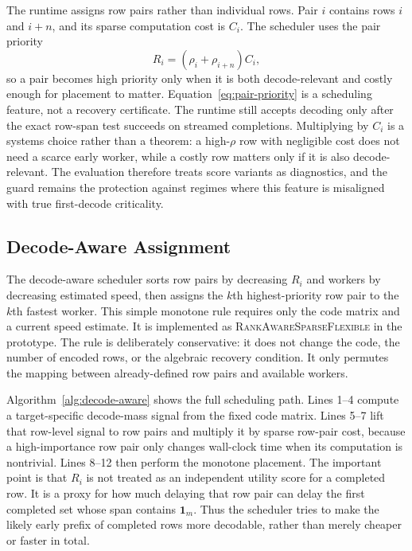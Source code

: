 The runtime assigns row pairs rather than individual rows.  Pair $i$ contains
rows $i$ and $i+n$, and its sparse computation cost is $C_i$.  The scheduler
uses the pair priority
\begin{equation}
  \label{eq:pair-priority}
  R_i = (\rho_i + \rho_{i+n}) C_i,
\end{equation}
so a pair becomes high priority only when it is both decode-relevant and costly
enough for placement to matter.  Equation~\eqref{eq:pair-priority} is a
scheduling feature, not a
recovery certificate.  The runtime still accepts decoding only after the exact
row-span test succeeds on streamed completions.  Multiplying by $C_i$ is a
systems choice rather than a theorem: a high-$\rho$ row with negligible cost
does not need a scarce early worker, while a costly row matters only if it is
also decode-relevant.  The evaluation therefore treats score variants as
diagnostics, and the guard remains the protection against regimes where this
feature is misaligned with true first-decode criticality.

\subsection{Decode-Aware Assignment}

The decode-aware scheduler sorts row pairs by decreasing $R_i$ and workers by
decreasing estimated speed, then assigns the $k$th highest-priority row pair to
the $k$th fastest worker.  This simple monotone rule requires only the code
matrix and a current speed estimate.  It is
implemented as \textsc{RankAwareSparseFlexible} in the prototype.
The rule is deliberately conservative: it does not change the code, the number
of encoded rows, or the algebraic recovery condition.  It only permutes the
mapping between already-defined row pairs and available workers.

Algorithm~\ref{alg:decode-aware} shows the full scheduling path.  Lines 1--4
compute a target-specific decode-mass signal from the fixed code matrix.
Lines 5--7 lift that row-level signal to row pairs and multiply it by sparse
row-pair cost, because a high-importance row pair only changes wall-clock time
when its computation is nontrivial.  Lines 8--12 then perform the monotone
placement.  The important point is that $R_i$ is not treated as an independent
utility score for a completed row.  It is a proxy for how much delaying that
row pair can delay the first completed set whose span contains
$\mathbf{1}_m$.  Thus the scheduler tries to make the likely early prefix of
completed rows more decodable, rather than merely cheaper or faster in total.

